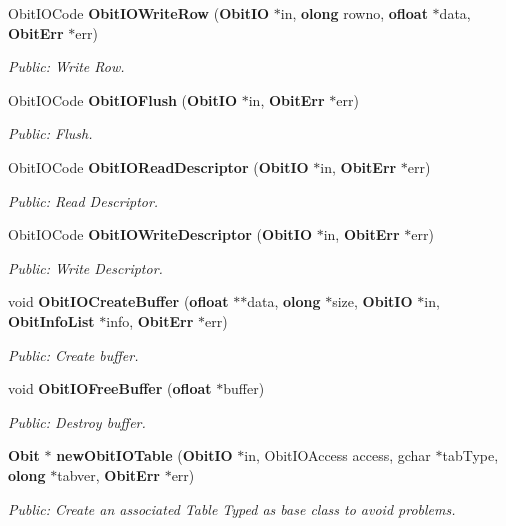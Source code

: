 \begin{CompactItemize}
Obit\-IOCode {\bf Obit\-IOWrite\-Row} ({\bf Obit\-IO} $\ast$in, {\bf olong} rowno, {\bf ofloat} $\ast$data, {\bf Obit\-Err} $\ast$err)
\begin{CompactList}\small\item\em Public: Write Row. \item\end{CompactList}\item 
Obit\-IOCode {\bf Obit\-IOFlush} ({\bf Obit\-IO} $\ast$in, {\bf Obit\-Err} $\ast$err)
\begin{CompactList}\small\item\em Public: Flush. \item\end{CompactList}\item 
Obit\-IOCode {\bf Obit\-IORead\-Descriptor} ({\bf Obit\-IO} $\ast$in, {\bf Obit\-Err} $\ast$err)
\begin{CompactList}\small\item\em Public: Read Descriptor. \item\end{CompactList}\item 
Obit\-IOCode {\bf Obit\-IOWrite\-Descriptor} ({\bf Obit\-IO} $\ast$in, {\bf Obit\-Err} $\ast$err)
\begin{CompactList}\small\item\em Public: Write Descriptor. \item\end{CompactList}\item 
void {\bf Obit\-IOCreate\-Buffer} ({\bf ofloat} $\ast$$\ast$data, {\bf olong} $\ast$size, {\bf Obit\-IO} $\ast$in, {\bf Obit\-Info\-List} $\ast$info, {\bf Obit\-Err} $\ast$err)
\begin{CompactList}\small\item\em Public: Create buffer. \item\end{CompactList}\item 
void {\bf Obit\-IOFree\-Buffer} ({\bf ofloat} $\ast$buffer)
\begin{CompactList}\small\item\em Public: Destroy buffer. \item\end{CompactList}\item 
{\bf Obit} $\ast$ {\bf new\-Obit\-IOTable} ({\bf Obit\-IO} $\ast$in, Obit\-IOAccess access, gchar $\ast$tab\-Type, {\bf olong} $\ast$tabver, {\bf Obit\-Err} $\ast$err)
\begin{CompactList}\small\item\em Public: Create an associated Table Typed as base class to avoid problems. \item\end{CompactList}\item 
$$
\end{CompactItemize}
